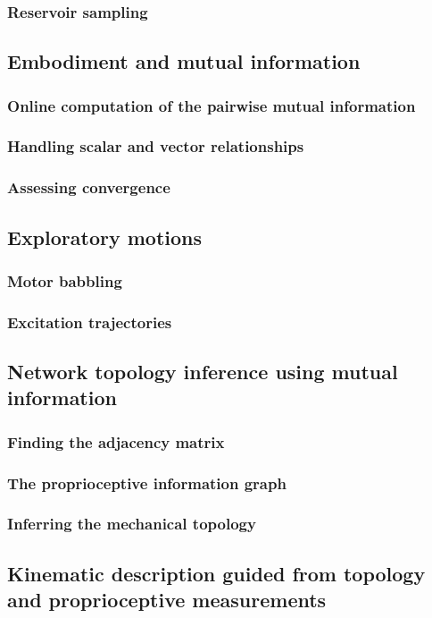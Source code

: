 \documentclass{article}
\begin{document}
\subsubsection{Reservoir sampling}
\subsection{Embodiment and mutual information}
\subsubsection{Online computation of the pairwise mutual information}
\subsubsection{Handling scalar and vector relationships}
\subsubsection{Assessing convergence}
\subsection{Exploratory motions}
\subsubsection{Motor babbling}
\subsubsection{Excitation trajectories}
\subsection{Network topology inference using mutual information}
\subsubsection{Finding the adjacency matrix}
\subsubsection{The proprioceptive information graph}
\subsubsection{Inferring the mechanical topology}
\subsection{Kinematic description guided from topology and proprioceptive measurements}
\end{document}
